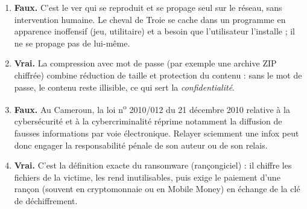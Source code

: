 \documentclass[11pt]{article}
\newcommand{\cle}[1]{{\popxbold\color{popdark}#1}}
\begin{document}
\begin{corrige}
\begin{enumerate}
\item \textbf{Faux.} C'est le \cle{ver} qui se reproduit et se propage seul sur le réseau, sans intervention humaine. Le \cle{cheval de Troie} se cache dans un programme en apparence inoffensif (jeu, utilitaire) et a besoin que l'utilisateur l'installe ; il ne se propage pas de lui-même.
\item \textbf{Vrai.} La compression avec mot de passe (par exemple une archive ZIP chiffrée) combine réduction de taille et protection du contenu : sans le mot de passe, le contenu reste illisible, ce qui sert la \emph{confidentialité}.
\item \textbf{Faux.} Au Cameroun, la loi n\textsuperscript{o} 2010/012 du 21 décembre 2010 relative à la cybersécurité et à la cybercriminalité réprime notamment la diffusion de fausses informations par voie électronique. Relayer sciemment une infox peut donc engager la responsabilité pénale de son auteur ou de son relais.
\item \textbf{Vrai.} C'est la définition exacte du \cle{ransomware} (rançongiciel) : il chiffre les fichiers de la victime, les rend inutilisables, puis exige le paiement d'une rançon (souvent en cryptomonnaie ou en Mobile Money) en échange de la clé de déchiffrement.
\end{enumerate}
\end{corrige}
\end{document}
